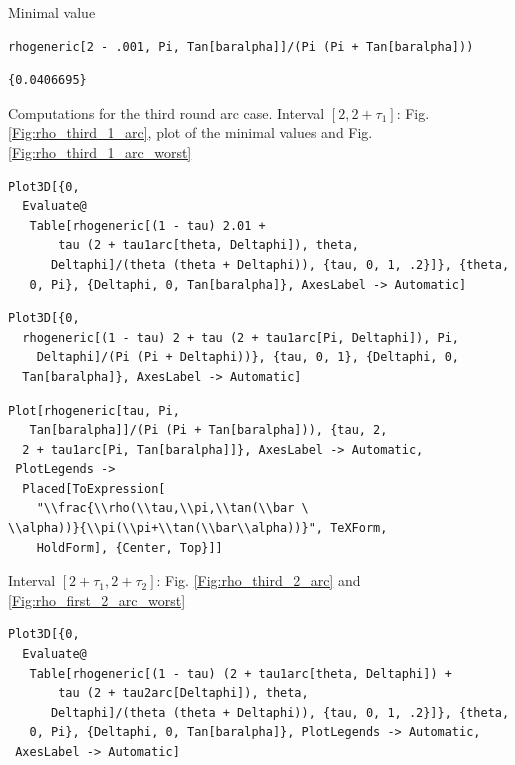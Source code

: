 \documentclass[reqno]{amsart}
\theoremstyle{definition} \newtheorem{definition}{Definition}[section]
\theoremstyle{definition} \newtheorem{remark}[definition]{Remark}
\theoremstyle{plain} \newtheorem{lemma}[definition]{Lemma}
\theoremstyle{plain} \newtheorem{proposition}[definition]{Proposition}
\theoremstyle{plain} \newtheorem{theorem}[definition]{Theorem}
\theoremstyle{plain} \newtheorem{corollary}[definition]{Corollary}
\theoremstyle{definition} \newtheorem{example}[definition]{Example}
\theoremstyle{plain} \newtheorem{claim}[clai]{Claim}
\theoremstyle{definition} \newtheorem{assumption}[definition]{Assumption}
\theoremstyle{definition} \newtheorem{observation}[definition]{Observation}
\newcommand{\1}{\mathbbm 1}
\newcommand{\smed}{\medskip}
\numberwithin{equation}{section} %
\theoremstyle{plain} \newtheorem*{theorem*}{Theorem}
\theoremstyle{plain} \newtheorem{mthm}[maintheorem]{Main Theorem}
\theoremstyle{plain} \newtheorem*{mthm*}{Main Theorem}
\theoremstyle{plain} \newtheorem*{conjecture*}{Conjecture}
\theoremstyle{plain} \newtheorem{conjecture}[definition]{Conjecture}
\theoremstyle{plain} \newtheorem*{problem*}{Problem}
\begin{document}
\smed
Minimal value
\smed
\begin{verbatim}
rhogeneric[2 - .001, Pi, Tan[baralpha]]/(Pi (Pi + Tan[baralpha]))
\end{verbatim}
\begin{verbatim}
{0.0406695}
\end{verbatim}
\smed
Computations for the third round arc case. Interval $[2,2+\tau_1]$: Fig. \ref{Fig:rho_third_1_arc}, plot of the minimal values and Fig. \ref{Fig:rho_third_1_arc_worst}
\smed
\begin{verbatim}
Plot3D[{0, 
  Evaluate@
   Table[rhogeneric[(1 - tau) 2.01 + 
       tau (2 + tau1arc[theta, Deltaphi]), theta, 
      Deltaphi]/(theta (theta + Deltaphi)), {tau, 0, 1, .2}]}, {theta,
   0, Pi}, {Deltaphi, 0, Tan[baralpha]}, AxesLabel -> Automatic]
\end{verbatim}
\begin{verbatim}
Plot3D[{0, 
  rhogeneric[(1 - tau) 2 + tau (2 + tau1arc[Pi, Deltaphi]), Pi, 
    Deltaphi]/(Pi (Pi + Deltaphi))}, {tau, 0, 1}, {Deltaphi, 0, 
  Tan[baralpha]}, AxesLabel -> Automatic]
\end{verbatim}
\begin{verbatim}
Plot[rhogeneric[tau, Pi, 
   Tan[baralpha]]/(Pi (Pi + Tan[baralpha])), {tau, 2, 
  2 + tau1arc[Pi, Tan[baralpha]]}, AxesLabel -> Automatic, 
 PlotLegends -> 
  Placed[ToExpression[
    "\\frac{\\rho(\\tau,\\pi,\\tan(\\bar \
\\alpha))}{\\pi(\\pi+\\tan(\\bar\\alpha))}", TeXForm, 
    HoldForm], {Center, Top}]]
\end{verbatim}
\smed
Interval $[2+\tau_1,2+\tau_2]$: Fig. \ref{Fig:rho_third_2_arc} and \ref{Fig:rho_first_2_arc_worst}
\smed
\begin{verbatim}
Plot3D[{0, 
  Evaluate@
   Table[rhogeneric[(1 - tau) (2 + tau1arc[theta, Deltaphi]) + 
       tau (2 + tau2arc[Deltaphi]), theta, 
      Deltaphi]/(theta (theta + Deltaphi)), {tau, 0, 1, .2}]}, {theta,
   0, Pi}, {Deltaphi, 0, Tan[baralpha]}, PlotLegends -> Automatic, 
 AxesLabel -> Automatic]
\end{verbatim}
\end{document}
